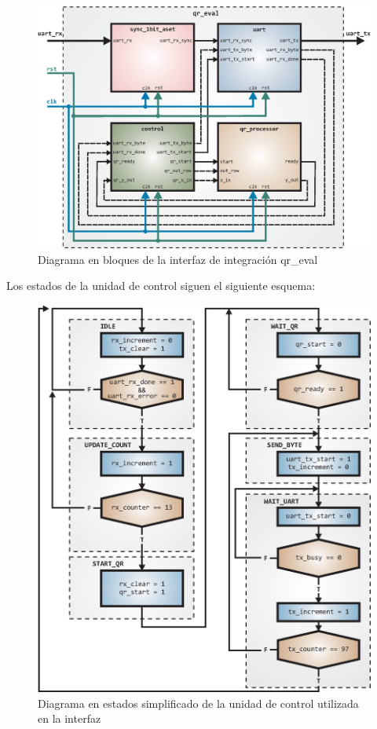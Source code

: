 \begin{figure}[!h]
  \begin{center}
    \includegraphics[width=\textwidth]{./figures/C05-qr_eval_diagram}
    \caption{Diagrama en bloques de la interfaz de integración qr\_eval}
    \label{fig:qr_eval_diagram}
  \end{center}
\end{figure}

\newpage

Los estados de la unidad de control siguen el siguiente esquema:

\begin{figure}[!h]
  \begin{center}
    \includegraphics[width=10 cm]{./figures/C05-control_asm}
    \caption{Diagrama en estados simplificado de la unidad de control utilizada en la interfaz}
    \label{fig:control_asm}
  \end{center}
\end{figure}

